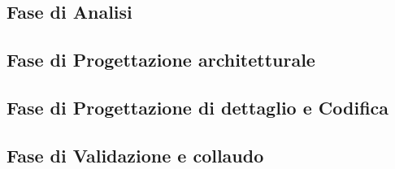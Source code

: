 \documentclass[../piano-di-progetto.tex]{subfiles}
\begin{document}
	\subsection{Fase di Analisi}
  \label{subsec:fase_analisi}
  \subsection{Fase di Progettazione architetturale}
  \label{subsec:fase_analisi}
  \subsection{Fase di Progettazione di dettaglio e Codifica}
  \label{subsec:fase_analisi}
  \subsection{Fase di Validazione e collaudo}
  \label{subsec:fase_analisi}
  
  
\end{document}
